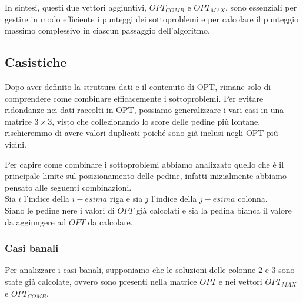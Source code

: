In sintesi, questi due vettori aggiuntivi, $OPT_{COMB}$ e $OPT_{MAX}$, sono essenziali per gestire in modo efficiente i punteggi dei 
sottoproblemi e per calcolare il punteggio massimo complessivo in ciascun passaggio dell'algoritmo.

\subsection{Casistiche}


Dopo aver definito la struttura dati e il contenuto di OPT, rimane solo di comprendere come combinare efficacemente i sottoproblemi. 
Per evitare ridondanze nei dati raccolti in OPT, possiamo generalizzare i vari casi in una matrice $3 \times 3$, visto che collezionando lo score delle pedine più lontane, rischieremmo di avere valori duplicati poiché sono già inclusi negli OPT più vicini.

Per capire come combinare i sottoproblemi abbiamo analizzato quello che è il principale limite sul posizionamento delle pedine, 
infatti inizialmente abbiamo pensato alle seguenti combinazioni.
\newline
\\
Sia $i$ l'indice della $i-esima$ riga e sia $j$ l'indice della $j-esima$ colonna.\\
Siano le pedine nere i valori di $OPT$ già calcolati e sia la pedina bianca il valore da aggiungere ad $OPT$ da calcolare.

\subsubsection*{Casi banali}

Per analizzare i casi banali, supponiamo che le soluzioni delle colonne $2$ e $3$ sono state già calcolate, ovvero sono presenti nella matrice $OPT$ e nei vettori $OPT_{MAX}$ e $OPT_{COMB}$.

